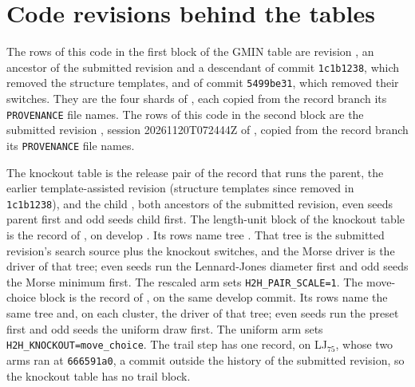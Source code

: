 \documentclass[journal=jctcce,manuscript=suppinfo]{achemso}
\begin{document}
\section{Code revisions behind the tables}
\label{sec:si-revisions}
The rows of this code in the first block of the GMIN table are revision
\texttt{}, an ancestor of
the submitted revision and a descendant of commit \texttt{1c1b1238}, which
removed the structure templates, and of commit \texttt{5499be31}, which
removed their switches.
They are the four shards of , each copied
from the record branch its \texttt{PROVENANCE} file names.
The rows of this code in the second block are the submitted revision
\texttt{}, session
20261120T072444Z of , copied from the
record branch its \texttt{PROVENANCE} file names.

The knockout table is the release pair of the record that runs the parent,
the earlier template-assisted revision
\texttt{} (structure
templates since removed in \texttt{1c1b1238}), and the child
\texttt{}, both ancestors
of the submitted revision, even seeds parent first and odd seeds child first.
The length-unit block of the knockout table is the record
\texttt{} of
, on develop
\texttt{}.
Its rows name tree \texttt{}.
That tree is the submitted revision's search source plus the knockout
switches, and the Morse driver is the driver of that tree; even seeds run
the Lennard-Jones diameter first and odd seeds the Morse minimum first.
The rescaled arm sets \texttt{H2H\_PAIR\_SCALE=1}.
The move-choice block is the record
\texttt{} of
, on the same develop commit.
Its rows name the same tree and, on each cluster, the driver of that
tree; even seeds run the preset first and odd seeds the uniform draw first.
The uniform arm sets \texttt{H2H\_KNOCKOUT=move\_choice}.
The trail step has one record, on LJ\(_{75}\), whose two arms ran at
\texttt{666591a0}, a commit outside the history of the submitted revision, so
the knockout table has no trail block.
\end{document}
